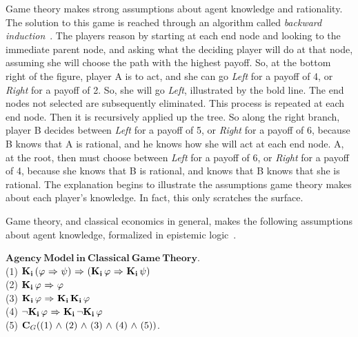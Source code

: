 Game theory makes strong assumptions about agent knowledge and rationality. The solution to this game is reached through an algorithm called \emph{backward induction}~\cite{VB_TowardPlay}. The players reason by starting at each end node and looking to the immediate parent node, and asking what the deciding player will do at that node, assuming she will choose the path with the highest payoff. So, at the bottom right of the figure, player A is to act, and she can go \emph{Left} for a payoff of 4, or \emph{Right} for a payoff of 2. So, she will go \emph{Left}, illustrated by the bold line. The end nodes not selected are subsequently eliminated. This process is repeated at each end node. Then it is recursively applied up the tree. So along the right branch, player B decides between \emph{Left} for a payoff of 5, or \emph{Right} for a payoff of 6, because B knows that A is rational, and he knows how she will act at each end node. A, at the root, then must choose between \emph{Left} for a payoff of 6, or \emph{Right} for a payoff of 4, because she knows that B is rational, and knows that B knows that she is rational. The explanation begins to illustrate the assumptions game theory makes about each player's knowledge. In fact, this only scratches the surface.


Game theory, and classical economics in general, makes the following assumptions about agent knowledge, formalized in epistemic logic~\cite{Aumann}. 

$\mathbf{Agency\  Model\  in\  Classical\  Game\  Theory}$.\\
(1) $\mathbf{K}_{\mathbf{i}}\,(\varphi {\ \Rightarrow \ } \psi) {\ \Rightarrow \ } (\mathbf{K}_{\mathbf{i}}\,\varphi {\ \Rightarrow \ } \mathbf{K}_{\mathbf{i}}\,\psi)$\\
(2) $\mathbf{K}_{\mathbf{i}}\,\varphi {\ \Rightarrow \ } \varphi$\\
(3) $\mathbf{K}_{\mathbf{i}}\,\varphi {\ \Rightarrow \ } \mathbf{K}_{\mathbf{i}}\,\mathbf{K}_{\mathbf{i}}\,\varphi$\\
(4) ${\neg} \mathbf{K}_{\mathbf{i}}\,\varphi {\ \Rightarrow \ } \mathbf{K}_{\mathbf{i}}\,{\neg}\mathbf{K}_{\mathbf{i}}\,\varphi$\\
(5) $\mathbf{C}_G ((1) {\ \wedge \ } (2) {\ \wedge \ } (3) {\ \wedge \ } (4) {\ \wedge \ } (5))$.

